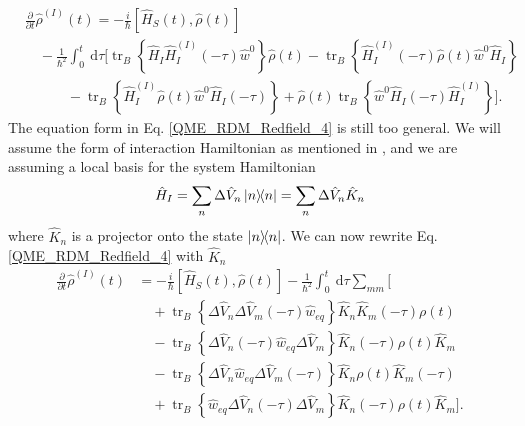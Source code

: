 \begin{equation}
\label{QME_RDM_Redfield_4}
\begin{aligned}
    &\frac{\partial}{\partial t}\hat{\rho}^{(I)}(t) = -\frac{i}{\hbar} [ \hat{H}_S(t), \hat{\rho}(t) ] \\
    &\quad -\frac{1}{\hbar^2} \int_{0}^{t} \mathrm{~d} \tau \Big[ \operatorname{tr}_B \left\{ \hat{H}_I \hat{H}_I^{(I)}(-\tau) \hat{w}^{0} \right\}  \hat{\rho}(t) -\operatorname{tr}_B \left\{ \hat{H}_I^{(I)}(-\tau) \hat{\rho}(t) \hat{w}^{0} \hat{H}_I \right\} \\
    & \quad \quad \quad -\operatorname{tr}_B \left\{ \hat{H}_I^{(I)} \hat{\rho}(t)  \hat{w}^{0} \hat{H}_I(-\tau) \right\}+ \hat{\rho}(t)\operatorname{tr}_B \left\{ \hat{w}^{0} \hat{H}_I(-\tau) \hat{H}_I^{(I)} \right\} \Big].
    \end{aligned}
\end{equation}
The equation form in Eq. \ref{QME_RDM_Redfield_4} is still too general. We will assume the form of interaction Hamiltonian as mentioned in \cite{breuer_theory_2002}, and we are assuming a local basis for the system Hamiltonian
\begin{equation}
    \hat{H}_I = \sum_n \Delta \hat{V}_n \ketbra{n} = \sum_n \Delta \hat{V}_n \hat{K}_n
\end{equation}
where $\hat{K}_n$ is a projector onto the state $\ketbra{n}$. We can now rewrite Eq. \ref{QME_RDM_Redfield_4} with $\hat{K}_n$ 
\begin{equation}
\label{QME_RDM_Redfield_5}
    \begin{aligned}
    \frac{\partial}{\partial t}\hat{\rho}^{(I)}(t) &= -\frac{i}{\hbar} [ \hat{H}_S(t), \hat{\rho}(t) ]  -\frac{1}{\hbar^{2}} \int_{0}^{t} \mathrm{~d} \tau \sum_{m m} \Big[ \\
    &\quad + \operatorname{tr}_{B}\left\{ \Delta \hat{V}_{n} \Delta \hat{V}_{m}(-\tau) \hat{w}_{eq} \right\} \hat{K}_{n} \hat{K}_{m}(-\tau) \rho(t)\\
    &\quad  - \operatorname{tr}_{B}\left\{\Delta \hat{V}_{n}(-\tau) \hat{w}_{eq} \Delta \hat{V}_{m}\right\} \hat{K}_{n}(-\tau) \rho(t) \hat{K}_{m} \\
    &\quad - \operatorname{tr}_{B}\left\{\Delta \hat{V}_{n} \hat{w}_{eq} \Delta \hat{V}_{m}(-\tau)\right\} \hat{K}_{n} \rho(t) \hat{K}_{m}(-\tau) \\
    &\quad  + \operatorname{tr}_{B}\left\{ \hat{w}_{eq} \Delta \hat{V}_{n}(-\tau) \Delta \hat{V}_{m} \right\} \hat{K}_{n}(-\tau) \rho(t) \hat{K}_{m}\Big].
    \end{aligned}
\end{equation}
